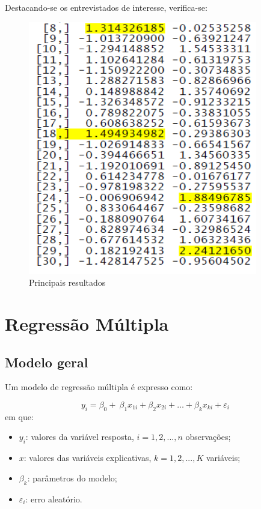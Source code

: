 \documentclass[12pt,brazil,oneside]{book}
\begin{document}
Destacando-se os entrevistados de interesse, verifica-se:

\begin{figure}[H]

{\centering \includegraphics[width=0.8\linewidth]{anfat2} 

}

\caption{Principais resultados}\label{fig:unnamed-chunk-34}
\end{figure}

\hypertarget{regressao-multipla}{%
\chapter{Regressão Múltipla}\label{regressao-multipla}}

\hypertarget{modelo-geral}{%
\section{Modelo geral}\label{modelo-geral}}

Um modelo de regressão múltipla é expresso como:

\[ 
y_{i} = \beta_0+\ \beta_1x_{1i}+\beta_2x_{2i}+\dots+\beta_kx_{ki}+\varepsilon_i\ 
\] \noindent em que:

\begin{itemize}
\item
  \(y_{i}\): valores da variável resposta, \(i = 1, 2,..., n\)
  observações;
\item
  \(x\): valores das variáveis explicativas, \(k = 1, 2,..., K\)
  variáveis;
\item
  \(\beta_k\): parâmetros do modelo;
\item
  \(\varepsilon_i\): erro aleatório.
\end{itemize}
\end{document}
